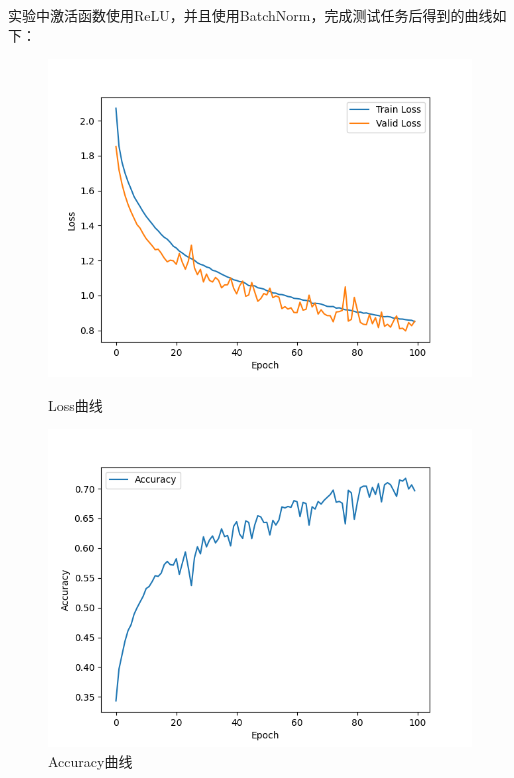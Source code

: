\documentclass{article}%
\begin{document}
实验中激活函数使用ReLU，并且使用BatchNorm，完成测试任务后得到的曲线如下：
\begin{figure}[H]
    \centering
    \begin{minipage}{0.49\linewidth}
        \centering
        \includegraphics[width=0.9\linewidth]{Loss_2.png}
        \caption{Loss曲线}
    \end{minipage}
    \begin{minipage}{0.49\linewidth}
        \centering
        \includegraphics[width=0.9\linewidth]{Acc_2.png}
        \caption{Accuracy曲线}
    \end{minipage}
\end{figure}
\end{document}
